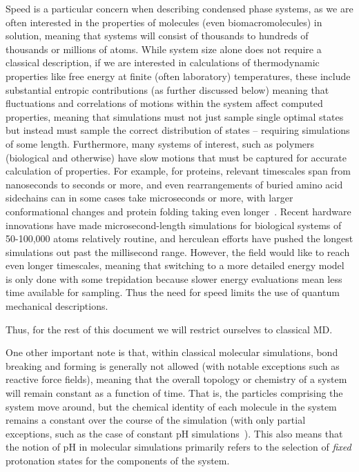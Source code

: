 \documentclass[9pt,bestpractices]{livecoms}
\begin{document}
Speed is a particular concern when describing condensed phase systems, as we are often interested in the properties of molecules (even biomacromolecules) in solution, meaning that systems will consist of thousands to hundreds of thousands or millions of atoms.
While system size alone does not require a classical description, if we are interested in calculations of thermodynamic properties like free energy at finite (often laboratory) temperatures, these include substantial entropic contributions (as further discussed below) meaning that fluctuations and correlations of motions within the system affect computed properties, meaning that simulations must not just sample single optimal states but instead must sample the correct distribution of states -- requiring simulations of some length.
Furthermore, many systems of interest, such as polymers (biological and otherwise) have slow motions that must be captured for accurate calculation of properties.
For example, for proteins, relevant timescales span from nanoseconds to seconds or more, and even rearrangements of buried amino acid sidechains can in some cases take microseconds or more, with larger conformational changes and protein folding taking even longer~\cite{Schlick:2010:, Mobley:2012:JComputAidedMolDes}. 
Recent hardware innovations have made microsecond-length simulations for biological systems of 50-100,000 atoms relatively routine, and herculean efforts have pushed the longest simulations out past the millisecond range.
However, the field would like to reach even longer timescales, meaning that switching to a more detailed energy model is only done with some trepidation because slower energy evaluations mean less time available for sampling. 
Thus the need for speed limits the use of quantum mechanical descriptions.

Thus, for the rest of this document we will restrict ourselves to classical MD.

One other important note is that, within classical molecular simulations, bond breaking and forming is generally not allowed (with notable exceptions such as reactive force fields),  meaning that the overall topology or chemistry of a system will remain constant as a function of time.
That is, the particles comprising the system move around, but the chemical identity of each molecule in the system remains a constant over the course of the simulation (with only partial exceptions, such as the case of constant pH simulations~\cite{Chen:2014:MolSimul}).
This also means that the notion of pH in molecular simulations primarily refers to the selection of \emph{fixed} protonation states for the components of the system.
\end{document}
